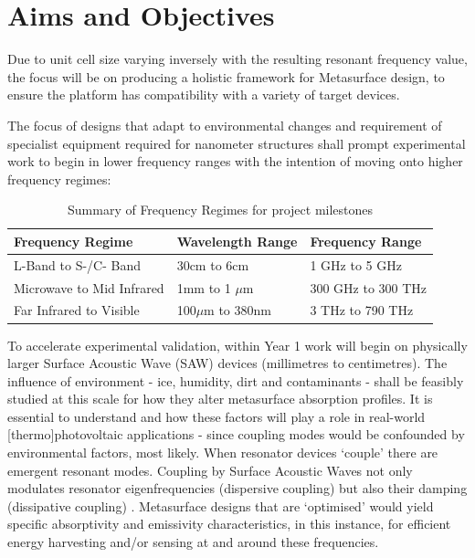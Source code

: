 


\section{Aims and Objectives} \label{section-with-figure}

Due to unit cell size varying inversely with the resulting resonant frequency value, the focus will be on producing a holistic framework for Metasurface design, to ensure the platform has compatibility with a variety of target devices.

The focus of designs that adapt to environmental changes and requirement of specialist equipment required for nanometer structures shall prompt experimental work to begin in lower frequency ranges with the intention of moving onto higher frequency regimes:

\begin{table}[h]
\centering
\begin{tabular}{|l|l|l|}
\hline
\textbf{Frequency Regime} & \textbf{Wavelength Range} & \textbf{Frequency Range} \\ \hline
L-Band to S-/C- Band & 30cm to 6cm & 1 GHz to 5 GHz \\ \hline
Microwave to Mid Infrared & 1mm to 1 $\mu$m & 300 GHz to 300 THz \\ \hline
Far Infrared to Visible & 100$\mu$m to 380nm & 3 THz to 790 THz  \\ \hline
\end{tabular}
\caption{Summary of Frequency Regimes for project milestones}
\label{tab:frequency_regimes}
\end{table}


To accelerate experimental validation, within Year 1 work will begin on physically larger Surface Acoustic Wave (SAW) devices (millimetres to centimetres). The influence of environment - ice, humidity, dirt and contaminants - shall be feasibly studied at this scale for how they alter metasurface absorption profiles. It is essential to understand and how these factors will play a role in real-world [thermo]photovoltaic applications - since coupling modes would be confounded by environmental factors, most likely. When resonator devices `couple' there are emergent resonant modes. Coupling by Surface Acoustic Waves not only modulates resonator eigenfrequencies (dispersive coupling) but also their damping (dissipative coupling) \cite{Rieger2022SurfaceAW}. Metasurface designs that are `optimised' would yield specific absorptivity and emissivity characteristics, in this instance, for efficient energy harvesting and/or sensing at and around these frequencies. 


